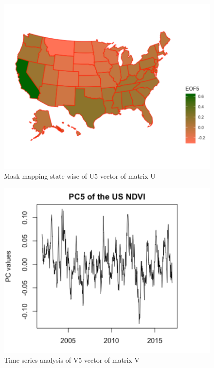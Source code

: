     
     \begin{figure}[H]
            \centering
            \includegraphics[width=0.70\linewidth]{figures/ch5/SVD/eof5.png}
            \caption{\label{fig:EOF_5} Mask mapping state wise of U5 vector of matrix U}
    \end{figure}
    
     \begin{figure}[H]
            \centering
            \includegraphics[width=0.70\linewidth]{figures/ch5/SVD/pc5.png}
            \caption{\label{fig:V_5} Time series analysis of V5 vector of matrix V}
    \end{figure}